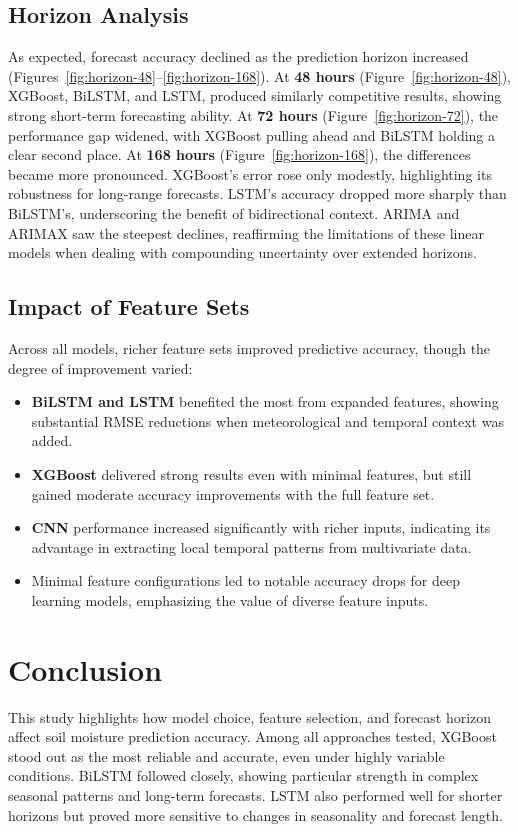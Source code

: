\documentclass{article}
\begin{document}
\subsection{Horizon Analysis}
As expected, forecast accuracy declined as the prediction horizon increased (Figures~\ref{fig:horizon-48}--\ref{fig:horizon-168}).  
At \textbf{48 hours} (Figure~\ref{fig:horizon-48}), XGBoost, BiLSTM, and LSTM, produced similarly competitive results, showing strong short-term forecasting ability.  
At \textbf{72 hours} (Figure~\ref{fig:horizon-72}), the performance gap widened, with XGBoost pulling ahead and BiLSTM holding a clear second place.  
At \textbf{168 hours} (Figure~\ref{fig:horizon-168}), the differences became more pronounced. XGBoost’s error rose only modestly, highlighting its robustness for long-range forecasts. LSTM’s accuracy dropped more sharply than BiLSTM’s, underscoring the benefit of bidirectional context. ARIMA and ARIMAX saw the steepest declines, reaffirming the limitations of these linear models when dealing with compounding uncertainty over extended horizons.

\subsection{Impact of Feature Sets}
Across all models, richer feature sets improved predictive accuracy, though the degree of improvement varied:
\begin{itemize}
    \item \textbf{BiLSTM and LSTM} benefited the most from expanded features, showing substantial RMSE reductions when meteorological and temporal context was added.
    \item \textbf{XGBoost} delivered strong results even with minimal features, but still gained moderate accuracy improvements with the full feature set.
    \item \textbf{CNN} performance increased significantly with richer inputs, indicating its advantage in extracting local temporal patterns from multivariate data.
    \item Minimal feature configurations led to notable accuracy drops for deep learning models, emphasizing the value of diverse feature inputs.
\end{itemize}


\section{Conclusion}
This study highlights how model choice, feature selection, and forecast horizon affect soil moisture prediction accuracy. Among all approaches tested, XGBoost stood out as the most reliable and accurate, even under highly variable conditions. BiLSTM followed closely, showing particular strength in complex seasonal patterns and long-term forecasts. LSTM also performed well for shorter horizons but proved more sensitive to changes in seasonality and forecast length.
\end{document}
